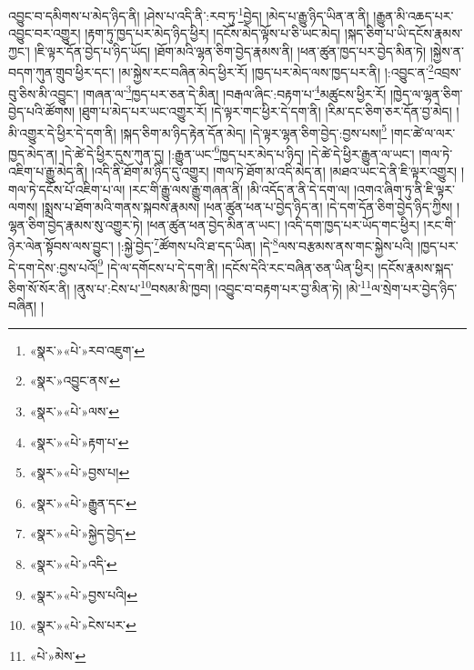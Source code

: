 འབྱུང་བ་དམིགས་པ་མེད་ཉིད་ནི། །ཤེས་པ་འདི་ནི་:རབ་ཏུ་\footnote{«སྣར་»«པེ་»རབ་འཇུག་}བྱེད། །མེད་པ་རྒྱུ་ཉིད་ཡིན་ན་ནི། །རྒྱུན་མི་འཆད་པར་འབྱུང་བར་འགྱུར། །རྟག་ཏུ་ཁྱད་པར་མེད་ཉིད་ཕྱིར། །དངོས་མེད་ལྟོས་པ་ཅི་ཡང་མེད། །སྐད་ཅིག་པ་ཡི་དངོས་རྣམས་ཀྱང་། །ཇི་ལྟར་དོན་བྱེད་པ་ཉིད་ཡོད། །ཐོག་མའི་ལྷན་ཅིག་བྱེད་རྣམས་ནི། །ཕན་ཚུན་ཁྱད་པར་བྱེད་མིན་ཏེ། །སྐྱེས་ན་བདག་ཀུན་གྲུབ་ཕྱིར་དང་། །མ་སྐྱེས་རང་བཞིན་མེད་ཕྱིར་རོ། །ཁྱད་པར་མེད་ལས་ཁྱད་པར་ནི། །:འབྱུང་ན་\footnote{«སྣར་»འབྱུང་ནས་}འབྲས་བུ་ཅིས་མི་འབྱུང་། །གཞན་ལ་\footnote{«སྣར་»«པེ་»ལས་}ཁྱད་པར་ཅན་དེ་མིན། །བརྒལ་ཞིང་:བརྟག་པ་\footnote{«སྣར་»«པེ་»རྟག་པ་}མཚུངས་ཕྱིར་རོ། །ཁྱེད་ལ་ལྷན་ཅིག་བྱེད་པའི་ཚོགས། །ཐུག་པ་མེད་པར་ཡང་འགྱུར་རོ། །དེ་ལྟར་གང་ཕྱིར་དེ་དག་ནི། །རིམ་དང་ཅིག་ཅར་དོན་བྱ་མེད། །མི་འགྱུར་དེ་ཕྱིར་དེ་དག་ནི། །སྐད་ཅིག་མ་ཉིད་རྟེན་དོན་མེད། །དེ་ལྟར་ལྷན་ཅིག་བྱེད་:བྱས་པས།\footnote{«སྣར་»«པེ་»བྱས་པ།} །གང་ཚེ་ལ་ལར་ཁྱད་མེད་ན། །དེ་ཚེ་དེ་ཕྱིར་དུས་ཀུན་དུ། །:རྒྱུན་ཡང་\footnote{«སྣར་»«པེ་»རྒྱུན་དང་}ཁྱད་པར་མེད་པ་ཉིད། །དེ་ཚེ་དེ་ཕྱིར་རྒྱུན་ལ་ཡང་། །གལ་ཏེ་འཇིག་པ་རྒྱུ་མེད་ནི། །འདི་ནི་ཐོག་མ་ཉིད་དུ་འགྱུར། །གལ་ཏེ་ཐོག་མ་འདི་མེད་ན། །མཐའ་ཡང་དེ་ནི་ཇི་ལྟར་འགྱུར། །གལ་ཏེ་དངོས་པོ་འཇིག་པ་ལ། །རང་གི་རྒྱུ་ལས་རྒྱུ་གཞན་ནི། །མི་འདོད་ན་ནི་དེ་དག་ལ། །འགའ་ཞིག་ཏུ་ནི་ཇི་ལྟར་ལགས། །སྨྲས་པ་ཐོག་མའི་གནས་སྐབས་རྣམས། །ཕན་ཚུན་ཕན་པ་བྱེད་ཉིད་ན། །དེ་དག་དོན་ཅིག་བྱེད་ཉིད་ཀྱིས། །ལྷན་ཅིག་བྱེད་རྣམས་སུ་འགྱུར་ཏེ། །ཕན་ཚུན་ཕན་བྱེད་མིན་ན་ཡང་། །འདི་དག་ཁྱད་པར་ཡོད་གང་ཕྱིར། །རང་གི་ཉེར་ལེན་སྟོབས་ལས་བྱུང་། །:སྐྱེ་བྱེད་\footnote{«སྣར་»«པེ་»སྐྱེད་བྱེད་}ཚོགས་པའི་ཐ་དད་ཡིན། །དེ་\footnote{«སྣར་»«པེ་»འདི་}ལས་བརྩམས་ནས་གང་སྐྱེས་པའི། །ཁྱད་པར་དེ་དག་དེས་:བྱས་པའོ།\footnote{«སྣར་»«པེ་»བྱས་པའི།} །དེ་ལ་དགོངས་པ་དེ་དག་ནི། །དངོས་དེའི་རང་བཞིན་ཅན་ཡིན་ཕྱིར། །དངོས་རྣམས་སྐད་ཅིག་སོ་སོར་ནི། །ནུས་པ་:ངེས་པ་\footnote{«སྣར་»«པེ་»ངེས་པར་}བསམ་མི་ཁྱབ། །འབྱུང་བ་བརྟག་པར་བྱ་མིན་ཏེ། །མེ་\footnote{«པེ་»མེས་}ལ་སྲེག་པར་བྱེད་ཉིད་བཞིན། །
